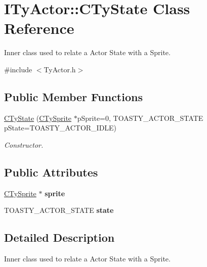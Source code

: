 \hypertarget{class_i_ty_actor_1_1_c_ty_state}{
\section{ITyActor::CTyState Class Reference}
\label{class_i_ty_actor_1_1_c_ty_state}
}


Inner class used to relate a Actor State with a Sprite.  




{\ttfamily \#include $<$TyActor.h$>$}

\subsection*{Public Member Functions}
\begin{DoxyCompactItemize}
\item 
\hyperlink{class_i_ty_actor_1_1_c_ty_state_a1df8c1e0a888f227fccc4713262b8f29}{CTyState} (\hyperlink{class_c_ty_sprite}{CTySprite} $\ast$pSprite=0, TOASTY\_\-ACTOR\_\-STATE pState=TOASTY\_\-ACTOR\_\-IDLE)
\begin{DoxyCompactList}\small\item\em Constructor. \end{DoxyCompactList}\end{DoxyCompactItemize}
\subsection*{Public Attributes}
\begin{DoxyCompactItemize}
\item 
\hypertarget{class_i_ty_actor_1_1_c_ty_state_ac323a9bfa3ec7cca1b95c3be92de5da1}{
\hyperlink{class_c_ty_sprite}{CTySprite} $\ast$ {\bfseries sprite}}
\label{class_i_ty_actor_1_1_c_ty_state_ac323a9bfa3ec7cca1b95c3be92de5da1}

\item 
\hypertarget{class_i_ty_actor_1_1_c_ty_state_ad744ea8266eddb703ed954daa1c3194b}{
TOASTY\_\-ACTOR\_\-STATE {\bfseries state}}
\label{class_i_ty_actor_1_1_c_ty_state_ad744ea8266eddb703ed954daa1c3194b}

\end{DoxyCompactItemize}


\subsection{Detailed Description}
Inner class used to relate a Actor State with a Sprite. 

